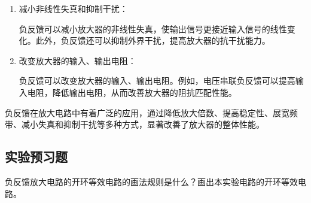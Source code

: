 \documentclass[dvipsnames, svgnames,a4paper,11pt]{article}
\begin{document}
\begin{enumerate}
\begin{enumerate}
					\item 减小非线性失真和抑制干扰：

						负反馈可以减小放大器的非线性失真，使输出信号更接近输入信号的线性变化。此外，负反馈还可以抑制外界干扰，提高放大器的抗干扰能力。

					\item 改变放大器的输入、输出电阻：

						负反馈可以改变放大器的输入、输出电阻。例如，电压串联负反馈可以提高输入电阻，降低输出电阻，从而改善放大器的阻抗匹配性能。
				\end{enumerate}
	
		\end{enumerate}

		负反馈在放大电路中有着广泛的应用，通过降低放大倍数、提高稳定性、展宽频带、减小失真和抑制干扰等多种方式，显著改善了放大器的整体性能。
		
			
			
			
			
			
		
		
		



	
	
	
	
	\subsection{实验预习题}
	
	
	\begin{question}
		负反馈放大电路的开环等效电路的画法规则是什么？画出本实验电路的开环等效电路。
	\end{question}
\end{document}
